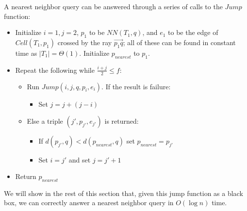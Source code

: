 \documentclass[10pt,a4paper]{amsart}
\newcommand{\ovar}[1]{\overrightarrow{#1}}
\newcommand{\Cell}{\mathit{Cell}}
\newcommand{\NN}{\mathit{NN}}
\newcommand{\nearest}{\mathit{nearest}}
\newcommand{\john}[1]{\textcolor{red}{#1}}
\newcommand{\yakov}[1]{\textcolor{blue}{Yakov: #1}}
\begin{document}
A nearest neighbor query can be answered through a series of calls to the $Jump$ function: 
\begin{itemize}
 \setlength{\itemsep}{1pt}
\setlength{\parskip}{0pt}
\setlength{\parsep}{0pt}    
 \item Initialize $i=1, j=2$, $p_1$ to be $\NN(T_1,q)$, and $e_1$ to be the edge of $\Cell(T_1,p_1)$ crossed by the ray $\ovar{p_1q}$; all of these can be found in constant time as $|T_1|=\Theta(1)$. Initialize $p_{\nearest}$ to $p_1$. 




 
 \item  Repeat the following while $\frac{i+j}{2} \leq  f$:
\begin{itemize}
 \setlength{\itemsep}{1pt}
\setlength{\parskip}{0pt}
\setlength{\parsep}{0pt}    
    \item Run $Jump(i,j,q,p_i,e_i)$. If the result is failure: 
 \begin{itemize}
  \setlength{\itemsep}{1pt}
\setlength{\parskip}{0pt}
\setlength{\parsep}{0pt} 
\item Set $j=j+(j-i)$
 \end{itemize}
   \item Else a triple $(j',p_{j'},e_{j'})$ is returned: 
\begin{itemize}
     \setlength{\itemsep}{1pt}
\setlength{\parskip}{0pt}
\setlength{\parsep}{0pt} 
            \item If $d(p_{j'},q) < d(p_{\nearest},q)$ set $p_{\nearest}=p_{j'}$
            \item Set $i=j'$ and
            set $j=j'+1$
\end{itemize}

\end{itemize}
\item Return $p_{\nearest}$
\end{itemize}
We will show in the rest of this section that, given this jump function as a black box, we can correctly answer a nearest neighbor query in $O(\log n)$ time. 
\end{document}
